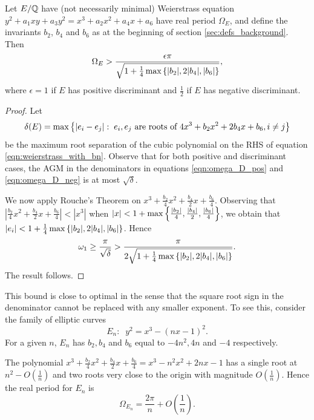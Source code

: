 \documentclass[10pt]{article}
\begin{document}
\begin{lemma}[S.]\label{ineq:Omega_bn_bound}
Let $E/\mathbb{Q}$ have (not necessarily minimal) Weierstrass equation $y^2 + a_1 xy + a_3 y^2 = x^3 + a_2 x^2 + a_4 x + a_6$ have real period $\Omega_E$, and define the invariants $b_2$, $b_4$ and $b_6$ as at the beginning of section \ref{sec:defs_background}. Then
\begin{equation}
\Omega_E > \frac{\epsilon \pi}{\sqrt{1+\frac{1}{4}\max\left\{|b_2|,2|b_4|,|b_6|\right\}}},
\end{equation}
where $\epsilon = 1$ if $E$ has positive discriminant and $\frac{1}{2}$ if $E$ has negative discriminant.
\end{lemma}
\begin{proof}
Let
\begin{equation}
\delta(E) = \max\left\{|e_i - e_j|: \; e_i,e_j \text{ are roots of }4x^3 + b_2  x^2 + 2 b_4 x + b_6, i\ne j\right\}
\end{equation}
be the maximum root separation of the cubic polynomial on the RHS of equation \ref{eqn:weierstrass_with_bn}.
Observe that for both positive and discriminant cases, the AGM in the denominators in equations \ref{eqn:omega_D_pos} and \ref{eqn:omega_D_neg} is at most $\sqrt{\delta}$. 

We now apply Rouche's Theorem on $x^3 + \frac{b_2}{4} x^2 + \frac{b_4}{2} x + \frac{b_6}{4}$. Observing that $|\frac{b_2}{4} x^2 + \frac{b_4}{2} x + \frac{b_6}{4}| < |x^3|$ when $|x| < 1+\max\left\{\frac{|b_2|}{4},\frac{|b_4|}{2},\frac{|b_6|}{4}\right\}$, we obtain that $|e_i| <  1+\frac{1}{4}\max\left\{|b_2|,2|b_4|,|b_6|\right\}$. Hence
\begin{equation*}
\omega_1 \ge \frac{\pi}{\sqrt{\delta}} > \frac{\pi}{2\sqrt{1+\frac{1}{4}\max\left\{|b_2|,2|b_4|,|b_6|\right\}}}.
\end{equation*}
The result follows.
\end{proof}

This bound is close to optimal in the sense that the square root sign in the denominator cannot be replaced with any smaller exponent. To see this, consider the family of elliptic curves
\begin{equation}
E_n: \;\; y^2 = x^3 - (nx-1)^2.
\end{equation}
For a given $n$, $E_n$ has $b_2,b_4$ and $b_6$ equal to $-4n^2,4n$ and $-4$ respectively.

The polynomial $x^3 + \frac{b_2}{4} x^2 + \frac{b_4}{2} x + \frac{b_6}{4} = x^3 -n^2 x^2 + 2n x - 1$ has a single root at $n^2 - O(\frac{1}{n})$ and two roots very close to the origin with magnitude $O(\frac{1}{n})$. Hence the real period for $E_n$ is
\begin{equation}
\Omega_{E_n} = \frac{2\pi}{n} + O\left(\frac{1}{n}\right).
\end{equation}
\end{document}

